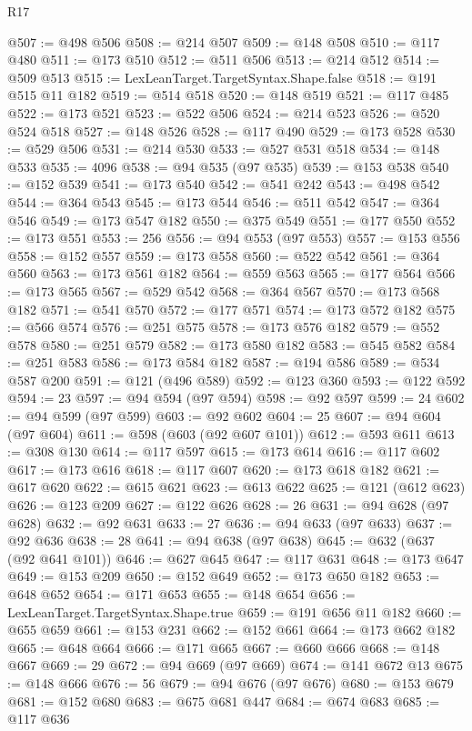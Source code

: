 \begin{lexlean}{R17}
\begin{coremodule}
@507 := @498 @506
@508 := @214 @507
@509 := @148 @508
@510 := @117 @480
@511 := @173 @510
@512 := @511 @506
@513 := @214 @512
@514 := @509 @513
@515 := LexLeanTarget.TargetSyntax.Shape.false
@518 := @191 @515 @11 @182
@519 := @514 @518
@520 := @148 @519
@521 := @117 @485
@522 := @173 @521
@523 := @522 @506
@524 := @214 @523
@526 := @520 @524 @518
@527 := @148 @526
@528 := @117 @490
@529 := @173 @528
@530 := @529 @506
@531 := @214 @530
@533 := @527 @531 @518
@534 := @148 @533
@535 := 4096
@538 := @94 @535 (@97 @535)
@539 := @153 @538
@540 := @152 @539
@541 := @173 @540
@542 := @541 @242
@543 := @498 @542
@544 := @364 @543
@545 := @173 @544
@546 := @511 @542
@547 := @364 @546
@549 := @173 @547 @182
@550 := @375 @549
@551 := @177 @550
@552 := @173 @551
@553 := 256
@556 := @94 @553 (@97 @553)
@557 := @153 @556
@558 := @152 @557
@559 := @173 @558
@560 := @522 @542
@561 := @364 @560
@563 := @173 @561 @182
@564 := @559 @563
@565 := @177 @564
@566 := @173 @565
@567 := @529 @542
@568 := @364 @567
@570 := @173 @568 @182
@571 := @541 @570
@572 := @177 @571
@574 := @173 @572 @182
@575 := @566 @574
@576 := @251 @575
@578 := @173 @576 @182
@579 := @552 @578
@580 := @251 @579
@582 := @173 @580 @182
@583 := @545 @582
@584 := @251 @583
@586 := @173 @584 @182
@587 := @194 @586
@589 := @534 @587 @200
@591 := @121 (@496 @589)
@592 := @123 @360
@593 := @122 @592
@594 := 23
@597 := @94 @594 (@97 @594)
@598 := @92 @597
@599 := 24
@602 := @94 @599 (@97 @599)
@603 := @92 @602
@604 := 25
@607 := @94 @604 (@97 @604)
@611 := @598 (@603 (@92 @607 @101))
@612 := @593 @611
@613 := @308 @130
@614 := @117 @597
@615 := @173 @614
@616 := @117 @602
@617 := @173 @616
@618 := @117 @607
@620 := @173 @618 @182
@621 := @617 @620
@622 := @615 @621
@623 := @613 @622
@625 := @121 (@612 @623)
@626 := @123 @209
@627 := @122 @626
@628 := 26
@631 := @94 @628 (@97 @628)
@632 := @92 @631
@633 := 27
@636 := @94 @633 (@97 @633)
@637 := @92 @636
@638 := 28
@641 := @94 @638 (@97 @638)
@645 := @632 (@637 (@92 @641 @101))
@646 := @627 @645
@647 := @117 @631
@648 := @173 @647
@649 := @153 @209
@650 := @152 @649
@652 := @173 @650 @182
@653 := @648 @652
@654 := @171 @653
@655 := @148 @654
@656 := LexLeanTarget.TargetSyntax.Shape.true
@659 := @191 @656 @11 @182
@660 := @655 @659
@661 := @153 @231
@662 := @152 @661
@664 := @173 @662 @182
@665 := @648 @664
@666 := @171 @665
@667 := @660 @666
@668 := @148 @667
@669 := 29
@672 := @94 @669 (@97 @669)
@674 := @141 @672 @13
@675 := @148 @666
@676 := 56
@679 := @94 @676 (@97 @676)
@680 := @153 @679
@681 := @152 @680
@683 := @675 @681 @447
@684 := @674 @683
@685 := @117 @636

\end{coremodule}
\end{lexlean}
